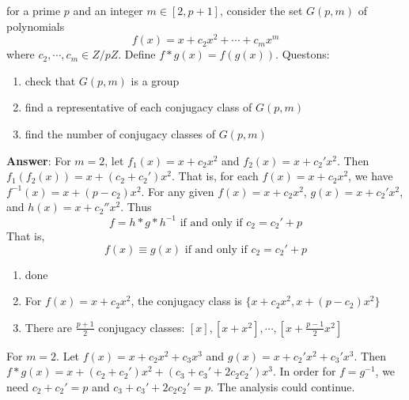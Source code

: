 \documentclass[11pt]{article}
\begin{document}
\clearpage
\noindent
for a prime $p$ and an integer $m\in [2,p+1]$,  consider the set $G(p,m)$ of polynomials 
$$f(x)=x+c_2x^2+\cdots+c_mx^m$$
where $c_2,\cdots, c_m\in Z/pZ$.  Define $f*g(x)=f(g(x))$.  Questons:
\begin{enumerate}
\item check that $G(p,m)$ is a group
\item find a representative of each conjugacy class of $G(p,m)$
\item find the number of conjugacy classes of $G(p,m)$
\end{enumerate}

{\bf Answer}:
For $m=2$,  let $f_1(x)=x+c_2x^2$ and $f_2(x)=x+c_2'x^2$. Then $f_1(f_2(x))=x+(c_2+c_2')x^2$.
That is, for each $f(x)=x+c_2x^2$, we have $f^{-1}(x)=x+(p-c_2)x^2$. For any given $f(x)=x+c_2x^2$, $g(x)=x+c_2'x^2$,
and $h(x)=x+c_2''x^2$. Thus 
$$f=h*g*h^{-1}\mbox{ if and only if }c_2=c_2'+p$$
That is,
$$f(x)\equiv g(x)\mbox{ if and only if }c_2=c_2'+p$$
\begin{enumerate}
\item done
\item For $f(x)=x+c_2x^2$, the conjugacy class is $\{x+c_2x^2, x+(p-c_2)x^2\}$
\item There are $\frac{p+1}{2}$ conjugacy classes: $[x],[x+x^2], \cdots, [x+\frac{p-1}{2}x^2]$
\end{enumerate}

For $m=2$.  Let $f(x)=x+c_2x^2+c_3x^3$ and $g(x)=x+c_2'x^2+c_3'x^3$. Then
$f*g(x)=x+(c_2+c_2')x^2+(c_3+c_3'+2c_2c_2')x^3$.  In order for $f=g^{-1}$, we need
$c_2+c_2'=p$ and $c_3+c_3'+2c_2c_2'=p$.  The analysis could continue.
\end{document}
